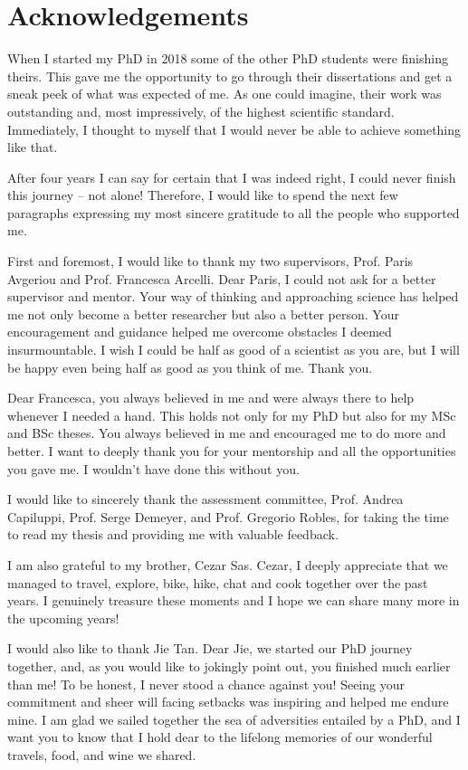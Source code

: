 \chapter*{Acknowledgements}

When I started my PhD in 2018 some of the other PhD students were finishing theirs.
This gave me the opportunity to go through their dissertations and get a sneak peek of what was expected of me.
As one could imagine, their work was outstanding and, most impressively, of the highest scientific standard.
Immediately, I thought to myself that I would never be able to achieve something like that.

After four years I can say for certain that I was indeed right, I could never finish this journey -- not alone!
Therefore, I would like to spend the next few paragraphs expressing my most sincere gratitude to all the people who supported me.

First and foremost, I would like to thank my two supervisors, Prof. Paris Avgeriou and Prof. Francesca Arcelli.
Dear Paris, I could not ask for a better supervisor and mentor. Your way of thinking and approaching science has helped me not only become a better researcher but also a better person. 
Your encouragement and guidance helped me overcome obstacles I deemed insurmountable.
I wish I could be half as good of a scientist as you are, but I will be happy even being half as good as you think of me. Thank you.

Dear Francesca, you always believed in me and were always there to help whenever I needed a hand. This holds not only for my PhD but also for my MSc and BSc theses.
You always believed in me and encouraged me to do more and better. I want to deeply thank you for your mentorship and all the opportunities you gave me. I wouldn't have done this without you.

I would like to sincerely thank the assessment committee, Prof. Andrea Capiluppi, Prof. Serge Demeyer, and Prof. Gregorio Robles, for taking the time to read my thesis and providing me with valuable feedback.

I am also grateful to my brother, Cezar Sas. Cezar, I deeply appreciate that we managed to travel, explore, bike, hike, chat and cook together over the past years. I genuinely treasure these moments and I hope we can share many more in the upcoming years! 

I would also like to thank Jie Tan. Dear Jie, we started our PhD journey together, and, as you would like to jokingly point out, you finished much earlier than me! To be honest, I never stood a chance against you! 
Seeing your commitment and sheer will facing setbacks was inspiring and helped me endure mine.
I am glad we sailed together the sea of adversities entailed by a PhD, and I want you to know that I hold dear to the lifelong memories of our wonderful travels, food, and wine we shared.

